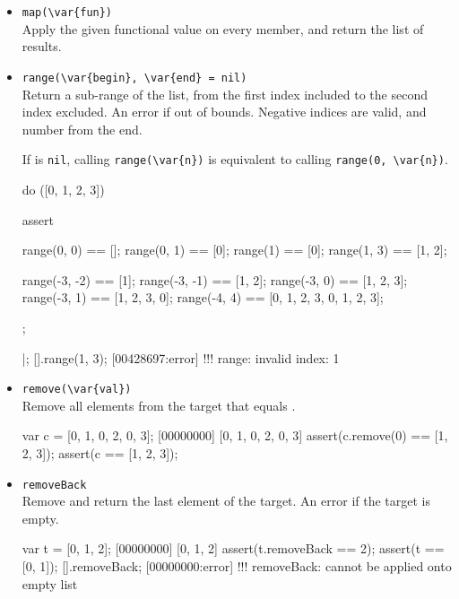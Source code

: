 \begin{itemize}
\item \lstinline|map(\var{fun})|\\
Apply the given functional value on every member, and return the list
of results.


\item \lstinline|range(\var{begin}, \var{end} = nil)|\\
  Return a sub-range of the list, from the first index included to the
  second index excluded.  An error if out of bounds.  Negative indices
  are valid, and number from the end.

  If  is \lstinline|nil|, calling \lstinline|range(\var{n})|
  is equivalent to calling \lstinline|range(0, \var{n})|.

\begin{urbiscript}[firstnumber=last]
do ([0, 1, 2, 3])
{
  assert
  {
    range(0, 0)   == [];
    range(0, 1)   == [0];
    range(1)      == [0];
    range(1, 3)   == [1, 2];

    range(-3, -2) == [1];
    range(-3, -1) == [1, 2];
    range(-3, 0)  == [1, 2, 3];
    range(-3, 1)  == [1, 2, 3, 0];
    range(-4, 4)  == [0, 1, 2, 3, 0, 1, 2, 3];
  };
}|;
[].range(1, 3);
[00428697:error] !!! range: invalid index: 1
\end{urbiscript}

\item \lstinline|remove(\var{val})|\\
  Remove all elements from the target that equals .

\begin{urbiscript}[firstnumber=last]
var c = [0, 1, 0, 2, 0, 3];
[00000000] [0, 1, 0, 2, 0, 3]
assert(c.remove(0) == [1, 2, 3]);
assert(c == [1, 2, 3]);
\end{urbiscript}

\item \lstinline|removeBack|\\
  Remove and return the last element of the target. An error if the
  target is empty.

\begin{urbiscript}[firstnumber=last]
var t = [0, 1, 2];
[00000000] [0, 1, 2]
assert(t.removeBack == 2);
assert(t == [0, 1]);
[].removeBack;
[00000000:error] !!! removeBack: cannot be applied onto empty list
\end{urbiscript}


\end{itemize}
